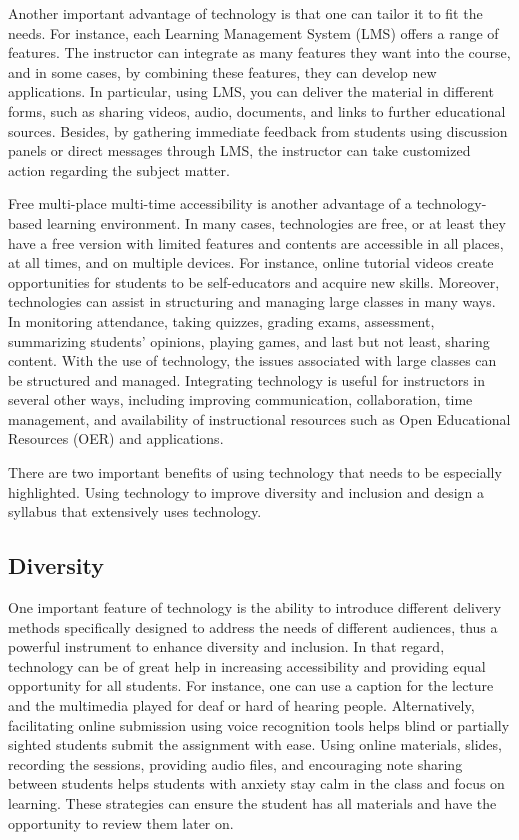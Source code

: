 \documentclass{book}
\begin{document}
Another important advantage of technology is that one can tailor it to fit the
needs. For instance, each Learning Management System (LMS) offers a range of
features. The instructor can integrate as many features they want into the
course, and in some cases, by combining these features, they can develop new
applications. In particular, using LMS, you can deliver the material in
different forms, such as sharing videos, audio, documents, and links to
further educational sources. Besides, by gathering immediate feedback from
students using discussion panels or direct messages through LMS, the
instructor can take customized action regarding the subject matter.

Free multi-place multi-time accessibility is another advantage of a
technology-based learning environment. In many cases, technologies are free,
or at least they have a free version with limited features and contents are
accessible in all places, at all times, and on multiple devices. For instance,
online tutorial videos create opportunities for students to be self-educators
and acquire new skills. Moreover, technologies can assist in structuring and
managing large classes in many ways. In monitoring attendance, taking quizzes,
grading exams, assessment, summarizing students' opinions, playing games, and
last but not least, sharing content. With the use of technology, the issues
associated with large classes can be structured and managed. Integrating
technology is useful for instructors in several other ways, including
improving communication, collaboration, time management, and availability of
instructional resources such as Open Educational Resources (OER) and
applications.

There are two important benefits of using technology that needs to be
especially highlighted. Using technology to improve diversity and inclusion
and design a syllabus that extensively uses technology.

\hypertarget{diversity}{%
\subsection{Diversity}\label{diversity}}

One important feature of technology is the ability to introduce different
delivery methods specifically designed to address the needs of different
audiences, thus a powerful instrument to enhance diversity and inclusion. In
that regard, technology can be of great help in increasing accessibility and
providing equal opportunity for all students. For instance, one can use a
caption for the lecture and the multimedia played for deaf or hard of hearing
people. Alternatively, facilitating online submission using voice recognition
tools helps blind or partially sighted students submit the assignment with
ease. Using online materials, slides, recording the sessions, providing audio
files, and encouraging note sharing between students helps students with
anxiety stay calm in the class and focus on learning. These strategies can
ensure the student has all materials and have the opportunity to review them
later on.
\end{document}
